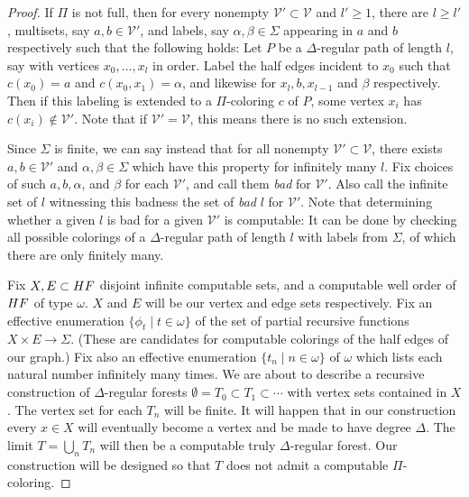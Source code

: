 \documentclass[10pt,a4paper]{amsart}
\newcommand{\HF}{\textnormal{HF}}
\begin{document}
\begin{proof}

If $\Pi$ is not full, then for every nonempty $\mathcal{V}' \subset \mathcal{V}$ and $l' \geq 1$, there are $l \geq l'$, multisets, say $a,b \in \mathcal{V}'$, and labels, say $\alpha, \beta \in \Sigma$ appearing in $a$ and $b$ respectively such that the following holds: Let $P$ be a $\Delta$-regular path of length $l$, say with vertices $x_0,\ldots,x_l$ in order. Label the half edges incident to $x_0$ such that $c(x_0) = a$ and $c(x_0,x_1) = \alpha$, and likewise for $x_l, b, x_{l-1}$ and $\beta$ respectively. Then if this labeling is extended to a $\Pi$-coloring $c$ of $P$, some vertex $x_i$ has $c(x_i) \not\in \mathcal{V}'$. Note that if $\mathcal{V}' = \mathcal{V}$, this means there is no such extension. 

Since $\Sigma$ is finite, we can say instead that for all nonempty $\mathcal{V}' \subset \mathcal{V}$, there exists $a,b \in \mathcal{V}'$ and $\alpha,\beta \in \Sigma$ which have this property for infinitely many $l$. Fix choices of such $a,b,\alpha$, and $\beta$ for each $\mathcal{V}'$, and call them \textit{bad} for $\mathcal{V}'$. Also call the infinite set of $l$ witnessing this badness the set of \textit{bad} $l$ for $\mathcal{V}'$. Note that determining whether a given $l$ is bad for a given $\mathcal{V}'$ is computable: It can be done by checking all possible colorings of a $\Delta$-regular path of length $l$ with labels from $\Sigma$, of which there are only finitely many.


Fix $X,E \subset \HF$ disjoint infinite computable sets, and a computable well order of $\HF$ of type $\omega$. $X$ and $E$ will be our vertex and edge sets respectively. Fix an effective enumeration $\{\phi_t \mid t \in \omega \}$ of the set of partial recursive functions $X \times E \rightarrow \Sigma$. (These are candidates for computable colorings of the half edges of our graph.) Fix also an effective enumeration $\{t_n \mid n \in \omega \}$ of $\omega$ which lists each natural number infinitely many times. We are about to describe a recursive construction of $\Delta$-regular forests $\emptyset = T_0 \subset T_1 \subset \cdots$ with vertex sets contained in $X$. The vertex set for each $T_n$ will be finite. It will happen that in our construction every $x \in X$ will eventually become a vertex and be made to have degree $\Delta$. The limit $T = \bigcup_n T_n$ will then be a computable truly $\Delta$-regular forest. Our construction will be designed so that $T$ does not admit a computable $\Pi$-coloring.


\end{proof}
\end{document}
